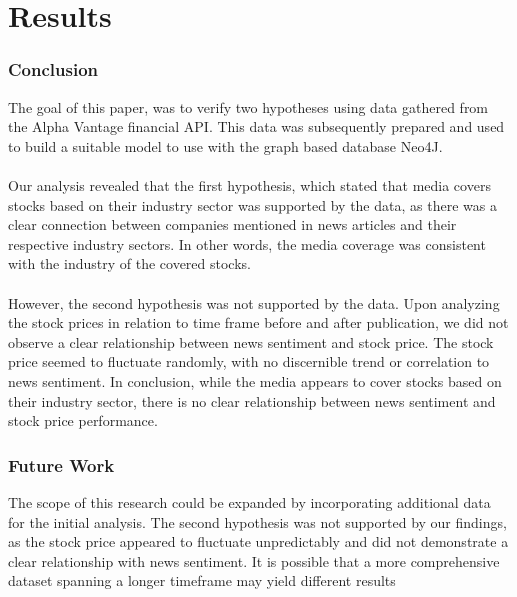 \chapter{Results}
\label{cha:results}


\subsection{Conclusion}
\label{cha:conclusion}
The goal of this paper, was to verify two hypotheses using data gathered from the Alpha Vantage financial API. This data was subsequently prepared and used to build a suitable model to use with the graph based database Neo4J. \\
\\
Our analysis revealed that the first hypothesis, which stated that media covers stocks based on their industry sector was supported by the data, as there was a clear connection between companies mentioned in news articles and their respective industry sectors. In other words, the media coverage was consistent with the industry of the covered stocks.\\
\\
However, the second hypothesis was not supported by the data. Upon analyzing the stock prices in relation to time frame before and after publication, we did not observe a clear relationship between news sentiment and stock price. The stock price seemed to fluctuate randomly, with no discernible trend or correlation to news sentiment. In conclusion, while the media appears to cover stocks based on their industry sector, there is no clear relationship between news sentiment and stock price performance.



\subsection{Future Work}
\label{cha:future-work}

The scope of this research could be expanded by incorporating additional data for the initial analysis. The second hypothesis was not supported by our findings, as the stock price appeared to fluctuate unpredictably and did not demonstrate a clear relationship with news sentiment. It is possible that a more comprehensive dataset spanning a longer timeframe may yield different results





